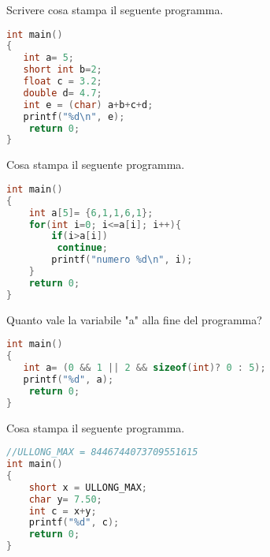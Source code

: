 \documentclass[addpoints,11pt]{exam}
\begin{document}
\begin{questions}
\question[3] Scrivere cosa stampa il seguente programma.

\begin{minipage}[t]{0.5\linewidth}
	\begin{lstlisting}[language=C]
int main()
{
   int a= 5;
   short int b=2;
   float c = 3.2;
   double d= 4.7;
   int e = (char) a+b+c+d;   
   printf("%d\n", e);
    return 0;
}
\end{lstlisting}
\end{minipage}
\begin{minipage}[t]{0.5\linewidth}
	\makeemptybox{140pt}
\end{minipage}




\question[2] Cosa stampa il seguente programma.

\begin{minipage}[t]{0.55\linewidth}
	\begin{lstlisting}[language=C]
int main()
{
    int a[5]= {6,1,1,6,1};
    for(int i=0; i<=a[i]; i++){
        if(i>a[i])
         continue;
        printf("numero %d\n", i);
    }
    return 0;
}
\end{lstlisting}
\end{minipage}
\begin{minipage}[t]{0.45\linewidth}
	\makeemptybox{150pt}
\end{minipage}



\question[2] Quanto vale la variabile "a" alla fine del programma?

\begin{minipage}[t]{0.6\linewidth}
	\begin{lstlisting}[language=C]
int main()
{
   int a= (0 && 1 || 2 && sizeof(int)? 0 : 5);
   printf("%d", a);
    return 0;
}
\end{lstlisting}
\end{minipage}
\begin{minipage}[t]{0.4\linewidth}
	\makeemptybox{120pt}
\end{minipage}



\question[2] Cosa stampa il seguente programma.

\begin{minipage}[t]{0.5\linewidth}
	\begin{lstlisting}[language=C]
//ULLONG_MAX = 8446744073709551615
int main()
{
    short x = ULLONG_MAX;
    char y= 7.50;
    int c = x+y;
    printf("%d", c);
    return 0;
}
\end{lstlisting}
\end{minipage}
\begin{minipage}[t]{0.5\linewidth}
	\makeemptybox{140pt}
\end{minipage}























\end{questions}
\end{document}
